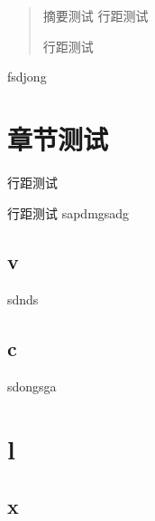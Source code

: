 




\frontmatter
\begin{abstract}
\kaishu{}摘要测试
行距测试

行距测试
\end{abstract}

\begin{englishabstract}
 fsdjong

\end{englishabstract}
\NJUTtableofcontents
\mainmatter
\chapter{章节测试}
行距测试

行距测试
\cite{Al-Osh1987} \cite{Xu2007}
sapdmgsadg
\section{v}
sdnds
\section{c}
sdongsga
\chapter{l}
\section{x}






